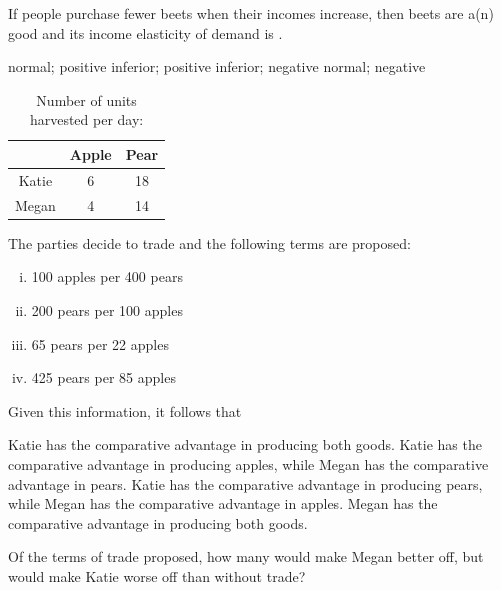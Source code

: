 \documentclass[addpoints,11pt]{exam}
\theoremstyle{definition}
\newcommand{\blank}[0]{\underline{\hspace{3cm}}}
\begin{document}
\begin{questions}
\question If people purchase fewer beets when their incomes increase, then beets are a(n) \blank good and its income elasticity of demand is \blank.

\begin{choices}
	\choice normal; positive
	\choice inferior; positive
	\CorrectChoice inferior; negative
	\choice normal; negative
\end{choices}



\begin{table}[H]
	\caption{Number of units harvested per day:}
	\centering
	\begin{tabular}{ c|c|c} 
		
		& Apple & Pear \\
		\hline
		Katie & 6 & 18 \\
		Megan & 4 & 14 \\
	\end{tabular}
	\label{MC8}
\end{table}



The parties decide to trade and the following terms are proposed:

\begin{enumerate}[i.]
	\item 100 apples per 400 pears
	\item 200 pears per 100 apples 
	\item 65 pears per 22 apples
	\item 425 pears per 85 apples
\end{enumerate}


\question \label{q12} Given this information, it follows that 

\begin{choices}
	\choice Katie has the comparative advantage in producing both goods.
	\CorrectChoice Katie has the comparative advantage in producing apples, while Megan has the comparative advantage in pears.
	\choice Katie has the comparative advantage in producing pears, while Megan has the comparative advantage in apples.
	\choice Megan has the comparative advantage in producing both goods.
\end{choices}

\question \label{q13} Of the terms of trade proposed, how many would make Megan better off, but would make Katie worse off than without trade?


\end{questions}
\end{document}
